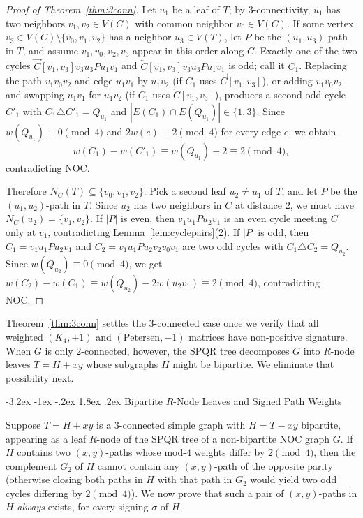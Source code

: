 \documentclass[10pt,letterpaper]{article}
\makeatletter
\renewcommand\section{\@startsection{section}{1}{\z@}%
  {-3.2ex \@plus -1ex \@minus -.2ex}%
  {1.8ex \@plus .2ex}%
  {\normalfont\large\bfseries}}
\theoremstyle{zetaplain}
\theoremstyle{zetadef}
\theoremstyle{remark}
\numberwithin{equation}{section}
\newcommand{\vecC}[1]{\overrightarrow{#1}}
\newcommand{\revC}[1]{\overleftarrow{#1}}
\makeatother
\begin{document}
\begin{proof}[Proof of Theorem~\ref{thm:3conn}]
Let $u_1$ be a leaf of $T$; by $3$-connectivity, $u_1$ has two neighbors $v_1, v_2 \in V(C)$ with common neighbor $v_0 \in V(C)$. If some vertex $v_3 \in V(C) \setminus \{v_0, v_1, v_2\}$ has a neighbor $u_3 \in V(T)$, let $P$ be the $(u_1, u_3)$-path in $T$, and assume $v_1, v_0, v_2, v_3$ appear in this order along $C$. Exactly one of the two cycles $\vecC{C}[v_1, v_3] v_3 u_3 P u_1 v_1$ and $\revC{C}[v_1, v_3] v_3 u_3 P u_1 v_1$ is odd; call it $C_1$. Replacing the path $v_1 v_0 v_2$ and edge $u_1 v_1$ by $u_1 v_2$ (if $C_1$ uses $\vecC{C}[v_1, v_3]$), or adding $v_1 v_0 v_2$ and swapping $u_1 v_1$ for $u_1 v_2$ (if $C_1$ uses $\revC{C}[v_1, v_3]$), produces a second odd cycle $C'_1$ with $C_1 \triangle C'_1 = Q_{u_1}$ and $|E(C_1) \cap E(Q_{u_1})| \in \{1, 3\}$. Since $w(Q_{u_1}) \equiv 0 \pmod 4$ and $2w(e) \equiv 2 \pmod 4$ for every edge $e$, we obtain
\[
  w(C_1) - w(C'_1) \equiv w(Q_{u_1}) - 2 \equiv 2 \pmod 4,
\]
contradicting NOC.

Therefore $N_C(T) \subseteq \{v_0, v_1, v_2\}$. Pick a second leaf $u_2 \ne u_1$ of $T$, and let $P$ be the $(u_1, u_2)$-path in $T$. Since $u_2$ has two neighbors in $C$ at distance $2$, we must have $N_C(u_2) = \{v_1, v_2\}$. If $|P|$ is even, then $v_1 u_1 P u_2 v_1$ is an even cycle meeting $C$ only at $v_1$, contradicting Lemma~\ref{lem:cyclepairs}(2). If $|P|$ is odd, then $C_1 = v_1 u_1 P u_2 v_1$ and $C_2 = v_1 u_1 P u_2 v_2 v_0 v_1$ are two odd cycles with $C_1 \triangle C_2 = Q_{u_2}$. Since $w(Q_{u_2}) \equiv 0 \pmod 4$, we get $w(C_2) - w(C_1) \equiv w(Q_{u_2}) - 2w(u_2 v_1) \equiv 2 \pmod 4$, contradicting NOC.
\end{proof}

Theorem~\ref{thm:3conn} settles the $3$-connected case once we verify that all weighted $(K_4, +1)$ and $(\mathrm{Petersen}, -1)$ matrices have non-positive signature. When $G$ is only $2$-connected, however, the SPQR tree decomposes $G$ into $R$-node leaves $T = H + xy$ whose subgraphs $H$ might be bipartite. We eliminate that possibility next.

\section{Bipartite \texorpdfstring{$R$}{R}-Node Leaves and Signed Path Weights}\label{sec:bipartite}

Suppose $T = H + xy$ is a $3$-connected simple graph with $H = T - xy$ bipartite, appearing as a leaf $R$-node of the SPQR tree of a non-bipartite NOC graph $G$. If $H$ contains two $(x, y)$-paths whose mod-$4$ weights differ by $2 \pmod 4$, then the complement $G_2$ of $H$ cannot contain any $(x, y)$-path of the opposite parity (otherwise closing both paths in $H$ with that path in $G_2$ would yield two odd cycles differing by $2 \pmod 4$). We now prove that such a pair of $(x, y)$-paths in $H$ \emph{always} exists, for every signing $\sigma$ of $H$.
\end{document}
